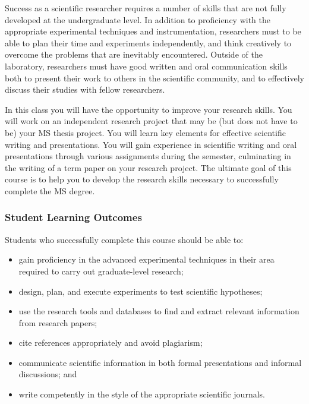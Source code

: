 Success as a scientific researcher requires a number of skills that are
not fully developed at the undergraduate level. In addition to
proficiency with the appropriate experimental techniques and
instrumentation, researchers must to be able to plan their time and
experiments independently, and think creatively to overcome the problems
that are inevitably encountered. Outside of the laboratory, researchers
must have good written and oral communication skills both to present
their work to others in the scientific community, and to effectively
discuss their studies with fellow researchers.

In this class you will have the opportunity to improve your research
skills. You will work on an independent research project that may be
(but does not have to be) your MS thesis project. You will learn key
elements for effective scientific writing and presentations. You will
gain experience in scientific writing and oral presentations through
various assignments during the semester, culminating in the writing of a
term paper on your research project. The ultimate goal of this course is
to help you to develop the research skills necessary to successfully
complete the MS degree.

\hypertarget{slo}{%
\subsubsection{Student Learning Outcomes}\label{slo}}

Students who successfully complete this course should be able to:

\begin{itemize}
\tightlist
\item
  gain proficiency in the advanced experimental techniques in their area
  required to carry out graduate-level research;
\item
  design, plan, and execute experiments to test scientific hypotheses;
\item
  use the research tools and databases to find and extract relevant
  information from research papers;
\item
  cite references appropriately and avoid plagiarism;
\item
  communicate scientific information in both formal presentations and
  informal discussions; and
\item
  write competently in the style of the appropriate scientific journals.
\end{itemize}

